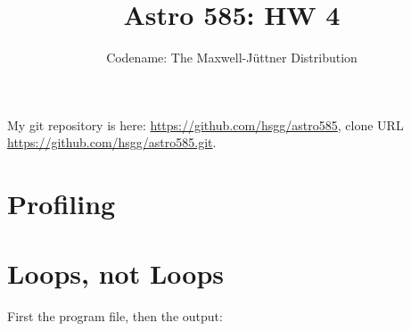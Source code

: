 \documentclass[11pt]{article}
\title{Astro 585: HW 4}
\author{Codename: The Maxwell-Jüttner Distribution}
\begin{document}
\maketitle

My git repository is here: \url{https://github.com/hsgg/astro585}, clone URL
\url{https://github.com/hsgg/astro585.git}.

\section{Profiling}


\section{Loops, not Loops}
First the program file, then the output:

\end{document}
